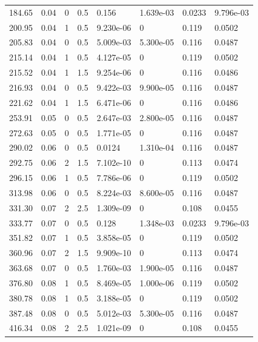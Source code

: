 \documentclass[preview]{standalone}
\begin{document}
{{\begin{tabular}{L{1.2cm}C{1.2cm} C{0.3cm}C{0.5cm} C{1.4cm}C{1.4cm} C{1.4cm}C{1.4cm}}
  184.65  &  0.04  & 0     & 0.5 &  0.156  & 1.639e-03  & 0.0233 &  9.796e-03   \\ 
  200.95  &  0.04  & 1     & 0.5 &  9.230e-06  & 0  & 0.119 &  0.0502   \\ 
  205.83  &  0.04  & 0     & 0.5 &  5.009e-03  & 5.300e-05  & 0.116 &  0.0487   \\ 
  215.14  &  0.04  & 1     & 0.5 &  4.127e-05  & 0  & 0.119 &  0.0502   \\ 
  215.52  &  0.04  & 1     & 1.5 &  9.254e-06  & 0  & 0.116 &  0.0486   \\ 
  216.93  &  0.04  & 0     & 0.5 &  9.422e-03  & 9.900e-05  & 0.116 &  0.0487   \\ 
  221.62  &  0.04  & 1     & 1.5 &  6.471e-06  & 0  & 0.116 &  0.0486   \\ 
  253.91  &  0.05  & 0     & 0.5 &  2.647e-03  & 2.800e-05  & 0.116 &  0.0487   \\ 
  272.63  &  0.05  & 0     & 0.5 &  1.771e-05  & 0  & 0.116 &  0.0487   \\ 
  290.02  &  0.06  & 0     & 0.5 &  0.0124  & 1.310e-04  & 0.116 &  0.0487   \\ 
  292.75  &  0.06  & 2     & 1.5 &  7.102e-10  & 0  & 0.113 &  0.0474   \\ 
  296.15  &  0.06  & 1     & 0.5 &  7.786e-06  & 0  & 0.119 &  0.0502   \\ 
  313.98  &  0.06  & 0     & 0.5 &  8.224e-03  & 8.600e-05  & 0.116 &  0.0487   \\ 
  331.30  &  0.07  & 2     & 2.5 &  1.309e-09  & 0  & 0.108 &  0.0455   \\ 
  333.77  &  0.07  & 0     & 0.5 &  0.128  & 1.348e-03  & 0.0233 &  9.796e-03   \\ 
  351.82  &  0.07  & 1     & 0.5 &  3.858e-05  & 0  & 0.119 &  0.0502   \\ 
  360.96  &  0.07  & 2     & 1.5 &  9.909e-10  & 0  & 0.113 &  0.0474   \\ 
  363.68  &  0.07  & 0     & 0.5 &  1.760e-03  & 1.900e-05  & 0.116 &  0.0487   \\ 
  376.80  &  0.08  & 1     & 0.5 &  8.469e-05  & 1.000e-06  & 0.119 &  0.0502   \\ 
  380.78  &  0.08  & 1     & 0.5 &  3.188e-05  & 0  & 0.119 &  0.0502   \\ 
  387.48  &  0.08  & 0     & 0.5 &  5.012e-03  & 5.300e-05  & 0.116 &  0.0487   \\ 
  416.34  &  0.08  & 2     & 2.5 &  1.021e-09  & 0  & 0.108 &  0.0455   \\ 

\end{tabular}}}
\end{document}
